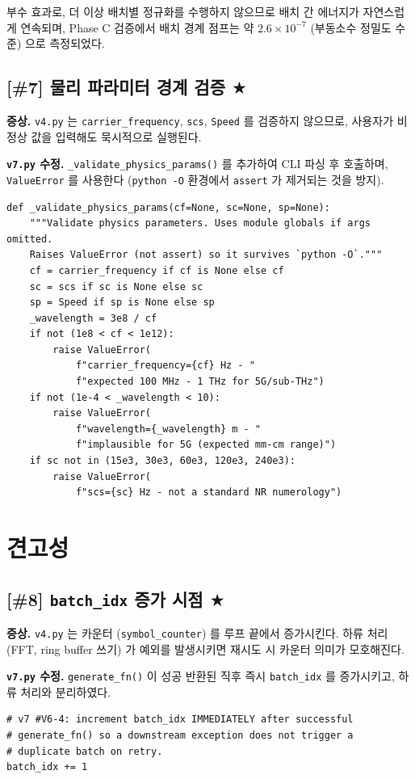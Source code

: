 \documentclass[11pt,a4paper]{article}
\newcommand{\sone}{\textcolor{starcolor}{$\bigstar$}}
\newcommand{\vfour}{\texttt{v4.py}}
\newcommand{\vseven}{\texttt{v7.py}}
\newcommand{\bugitem}[3]{%
  \subsection{[\##1] #2 \hfill #3}%
  \vspace{-0.5em}%
}
\begin{document}
부수 효과로, 더 이상 배치별 정규화를 수행하지 않으므로 배치 간 에너지가
자연스럽게 연속되며, Phase C 검증에서 배치 경계 점프는 약
$2.6\times 10^{-7}$ (부동소수 정밀도 수준) 으로 측정되었다.

\bugitem{7}{물리 파라미터 경계 검증}{\sone}

\textbf{증상.} \vfour{} 는 \texttt{carrier\_frequency}, \texttt{scs},
\texttt{Speed} 를 검증하지 않으므로, 사용자가 비정상 값을 입력해도 묵시적으로
실행된다.

\textbf{\vseven{} 수정.} \texttt{\_validate\_physics\_params()} 를 추가하여
CLI 파싱 후 호출하며, \texttt{ValueError} 를 사용한다 (\texttt{python -O}
환경에서 \texttt{assert} 가 제거되는 것을 방지).
\begin{lstlisting}[caption={v7.py: lines 256--274}]
def _validate_physics_params(cf=None, sc=None, sp=None):
    """Validate physics parameters. Uses module globals if args omitted.
    Raises ValueError (not assert) so it survives `python -O`."""
    cf = carrier_frequency if cf is None else cf
    sc = scs if sc is None else sc
    sp = Speed if sp is None else sp
    _wavelength = 3e8 / cf
    if not (1e8 < cf < 1e12):
        raise ValueError(
            f"carrier_frequency={cf} Hz - "
            f"expected 100 MHz - 1 THz for 5G/sub-THz")
    if not (1e-4 < _wavelength < 10):
        raise ValueError(
            f"wavelength={_wavelength} m - "
            f"implausible for 5G (expected mm-cm range)")
    if sc not in (15e3, 30e3, 60e3, 120e3, 240e3):
        raise ValueError(
            f"scs={sc} Hz - not a standard NR numerology")
\end{lstlisting}

\section{견고성}
\label{sec:robustness}

\bugitem{8}{\texttt{batch\_idx} 증가 시점}{\sone}

\textbf{증상.} \vfour{} 는 카운터 (\texttt{symbol\_counter}) 를 루프 끝에서
증가시킨다. 하류 처리 (FFT, ring buffer 쓰기) 가 예외를 발생시키면
재시도 시 카운터 의미가 모호해진다.

\textbf{\vseven{} 수정.} \texttt{generate\_fn()} 이 성공 반환된 직후
즉시 \texttt{batch\_idx} 를 증가시키고, 하류 처리와 분리하였다.
\begin{lstlisting}[caption={v7.py: lines 2199--2202}]
# v7 #V6-4: increment batch_idx IMMEDIATELY after successful
# generate_fn() so a downstream exception does not trigger a
# duplicate batch on retry.
batch_idx += 1
\end{lstlisting}
\end{document}
